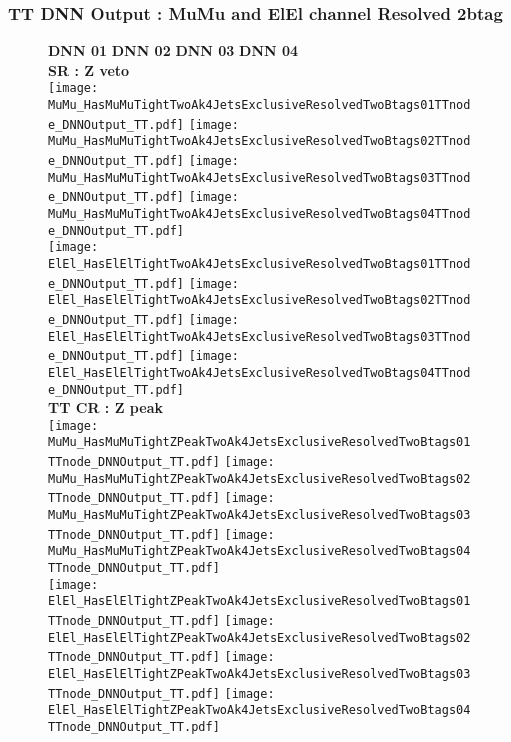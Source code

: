 \documentclass[9pt]{beamer}
\begin{document}
\begin{frame}
	\frametitle{TT DNN Output : MuMu and ElEl channel Resolved 2btag}
	\begin{figure}
	    \textbf{DNN 01} \hspace{1.2cm} \textbf{DNN 02} \hspace{1.2cm} \textbf{DNN 03} \hspace{1.2cm} \textbf{DNN 04} \\
        \centering
        \textbf{SR : Z veto} \\
		\texttt{[image: MuMu\_HasMuMuTightTwoAk4JetsExclusiveResolvedTwoBtags01TTnode\_DNNOutput\_TT.pdf]}
		\texttt{[image: MuMu\_HasMuMuTightTwoAk4JetsExclusiveResolvedTwoBtags02TTnode\_DNNOutput\_TT.pdf]}
		\texttt{[image: MuMu\_HasMuMuTightTwoAk4JetsExclusiveResolvedTwoBtags03TTnode\_DNNOutput\_TT.pdf]}
		\texttt{[image: MuMu\_HasMuMuTightTwoAk4JetsExclusiveResolvedTwoBtags04TTnode\_DNNOutput\_TT.pdf]}\\
		\texttt{[image: ElEl\_HasElElTightTwoAk4JetsExclusiveResolvedTwoBtags01TTnode\_DNNOutput\_TT.pdf]}
		\texttt{[image: ElEl\_HasElElTightTwoAk4JetsExclusiveResolvedTwoBtags02TTnode\_DNNOutput\_TT.pdf]}
		\texttt{[image: ElEl\_HasElElTightTwoAk4JetsExclusiveResolvedTwoBtags03TTnode\_DNNOutput\_TT.pdf]}
		\texttt{[image: ElEl\_HasElElTightTwoAk4JetsExclusiveResolvedTwoBtags04TTnode\_DNNOutput\_TT.pdf]}\\
        \textbf{TT CR : Z peak} \\
		\texttt{[image: MuMu\_HasMuMuTightZPeakTwoAk4JetsExclusiveResolvedTwoBtags01TTnode\_DNNOutput\_TT.pdf]}
		\texttt{[image: MuMu\_HasMuMuTightZPeakTwoAk4JetsExclusiveResolvedTwoBtags02TTnode\_DNNOutput\_TT.pdf]}
		\texttt{[image: MuMu\_HasMuMuTightZPeakTwoAk4JetsExclusiveResolvedTwoBtags03TTnode\_DNNOutput\_TT.pdf]}
		\texttt{[image: MuMu\_HasMuMuTightZPeakTwoAk4JetsExclusiveResolvedTwoBtags04TTnode\_DNNOutput\_TT.pdf]}\\
		\texttt{[image: ElEl\_HasElElTightZPeakTwoAk4JetsExclusiveResolvedTwoBtags01TTnode\_DNNOutput\_TT.pdf]}
		\texttt{[image: ElEl\_HasElElTightZPeakTwoAk4JetsExclusiveResolvedTwoBtags02TTnode\_DNNOutput\_TT.pdf]}
		\texttt{[image: ElEl\_HasElElTightZPeakTwoAk4JetsExclusiveResolvedTwoBtags03TTnode\_DNNOutput\_TT.pdf]}
		\texttt{[image: ElEl\_HasElElTightZPeakTwoAk4JetsExclusiveResolvedTwoBtags04TTnode\_DNNOutput\_TT.pdf]}\\
	\end{figure}
\end{frame}
\end{document}
